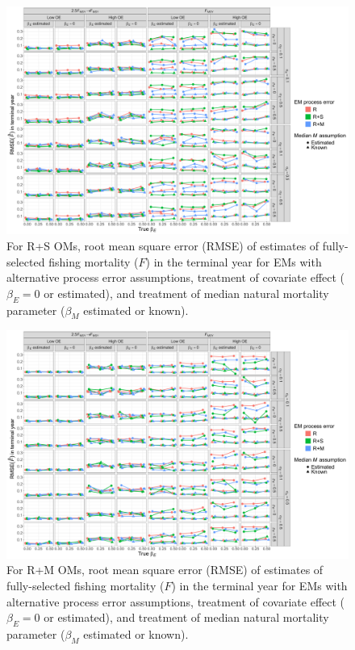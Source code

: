 \documentclass[
  12pt,
]{article}
\begin{document}
\begin{landscape}
\begin{figure}
\begin{center}
\includegraphics[height = \textheight]{terminal_year_F_rmse_RSom}
\end{center}
\caption{For R+S OMs, root mean square error (RMSE) of estimates of fully-selected fishing mortality ($F$)  in the terminal year for EMs with alternative process error assumptions, treatment of covariate effect ($\beta_E = 0$ or estimated), and treatment of median natural mortality parameter ($\beta_M$ estimated or known).}\label{terminal_F_rmse_RSom}
\end{figure}
\end{landscape}

\begin{landscape}
\begin{figure}
\begin{center}
\includegraphics[height = \textheight]{terminal_year_F_rmse_RMom}
\end{center}
\caption{For R+M OMs, root mean square error (RMSE) of estimates of fully-selected fishing mortality ($F$)  in the terminal year for EMs with alternative process error assumptions, treatment of covariate effect ($\beta_E = 0$ or estimated), and treatment of median natural mortality parameter ($\beta_M$ estimated or known).}\label{terminal_F_rmse_RMom}
\end{figure}
\end{landscape}
\end{document}
